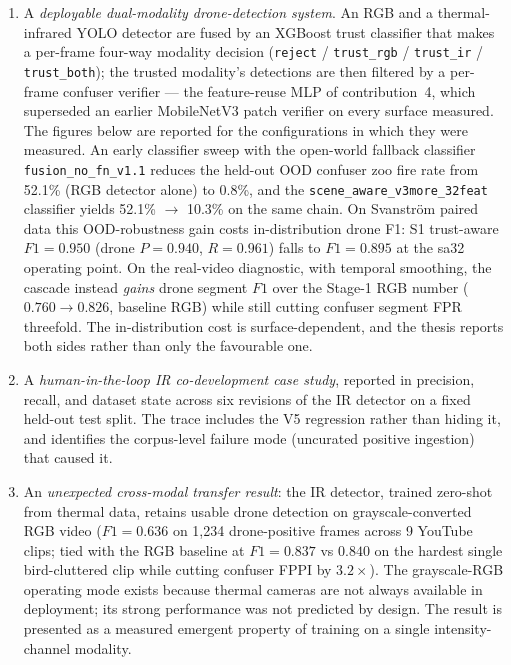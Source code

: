 \begin{enumerate}
    \item A \emph{deployable dual-modality drone-detection system}. An RGB and a thermal-infrared YOLO detector are fused by an XGBoost trust classifier that makes a per-frame four-way modality decision (\texttt{reject} / \texttt{trust\_rgb} / \texttt{trust\_ir} / \texttt{trust\_both}); the trusted modality's detections are then filtered by a per-frame confuser verifier --- the feature-reuse MLP of contribution~4, which superseded an earlier MobileNetV3 patch verifier on every surface measured. The figures below are reported for the configurations in which they were measured. An early classifier sweep with the open-world fallback classifier \texttt{fusion\_no\_fn\_v1.1} reduces the held-out OOD confuser zoo fire rate from 52.1\% (RGB detector alone) to 0.8\%, and the \texttt{scene\_aware\_v3more\_32feat} classifier yields 52.1\% $\to$ 10.3\% on the same chain. On Svanstr\"om paired data this OOD-robustness gain costs in-distribution drone F1: S1 trust-aware $F1=0.950$ (drone $P=0.940$, $R=0.961$) falls to $F1=0.895$ at the sa32 operating point. On the real-video diagnostic, with temporal smoothing, the cascade instead \emph{gains} drone segment $F1$ over the Stage-1 RGB number ($0.760 \to 0.826$, baseline RGB) while still cutting confuser segment FPR threefold. The in-distribution cost is surface-dependent, and the thesis reports both sides rather than only the favourable one.
    \item A \emph{human-in-the-loop IR co-development case study}, reported in precision, recall, and dataset state across six revisions of the IR detector on a fixed held-out test split. The trace includes the V5 regression rather than hiding it, and identifies the corpus-level failure mode (uncurated positive ingestion) that caused it.
    \item An \emph{unexpected cross-modal transfer result}: the IR detector, trained zero-shot from thermal data, retains usable drone detection on grayscale-converted RGB video ($F1=0.636$ on 1{,}234 drone-positive frames across 9 YouTube clips; tied with the RGB baseline at $F1=0.837$ vs $0.840$ on the hardest single bird-cluttered clip while cutting confuser FPPI by $3.2\times$). The grayscale-RGB operating mode exists because thermal cameras are not always available in deployment; its strong performance was not predicted by design. The result is presented as a measured emergent property of training on a single intensity-channel modality.

\end{enumerate}
